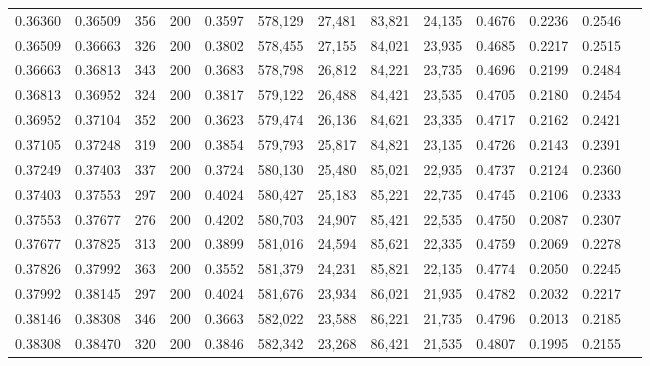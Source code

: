 \begin{tabular}{rrrrrrrrrrrrr}
0.36360 & 0.36509 &    356 & 200 &                                     0.3597 & 578,129 &  27,481 &  83,821 &  24,135 & 0.4676 & 0.2236 & 0.2546 \\
0.36509 & 0.36663 &    326 & 200 &                                     0.3802 & 578,455 &  27,155 &  84,021 &  23,935 & 0.4685 & 0.2217 & 0.2515 \\
0.36663 & 0.36813 &    343 & 200 &                                     0.3683 & 578,798 &  26,812 &  84,221 &  23,735 & 0.4696 & 0.2199 & 0.2484 \\
0.36813 & 0.36952 &    324 & 200 &                                     0.3817 & 579,122 &  26,488 &  84,421 &  23,535 & 0.4705 & 0.2180 & 0.2454 \\
0.36952 & 0.37104 &    352 & 200 &                                     0.3623 & 579,474 &  26,136 &  84,621 &  23,335 & 0.4717 & 0.2162 & 0.2421 \\
0.37105 & 0.37248 &    319 & 200 &                                     0.3854 & 579,793 &  25,817 &  84,821 &  23,135 & 0.4726 & 0.2143 & 0.2391 \\
0.37249 & 0.37403 &    337 & 200 &                                     0.3724 & 580,130 &  25,480 &  85,021 &  22,935 & 0.4737 & 0.2124 & 0.2360 \\
0.37403 & 0.37553 &    297 & 200 &                                     0.4024 & 580,427 &  25,183 &  85,221 &  22,735 & 0.4745 & 0.2106 & 0.2333 \\
0.37553 & 0.37677 &    276 & 200 &                                     0.4202 & 580,703 &  24,907 &  85,421 &  22,535 & 0.4750 & 0.2087 & 0.2307 \\
0.37677 & 0.37825 &    313 & 200 &                                     0.3899 & 581,016 &  24,594 &  85,621 &  22,335 & 0.4759 & 0.2069 & 0.2278 \\
0.37826 & 0.37992 &    363 & 200 &                                     0.3552 & 581,379 &  24,231 &  85,821 &  22,135 & 0.4774 & 0.2050 & 0.2245 \\
0.37992 & 0.38145 &    297 & 200 &                                     0.4024 & 581,676 &  23,934 &  86,021 &  21,935 & 0.4782 & 0.2032 & 0.2217 \\
0.38146 & 0.38308 &    346 & 200 &                                     0.3663 & 582,022 &  23,588 &  86,221 &  21,735 & 0.4796 & 0.2013 & 0.2185 \\
0.38308 & 0.38470 &    320 & 200 &                                     0.3846 & 582,342 &  23,268 &  86,421 &  21,535 & 0.4807 & 0.1995 & 0.2155 \\

\end{tabular}
